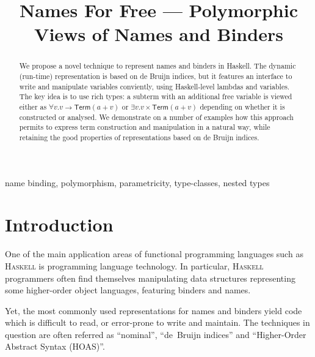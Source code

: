 \documentclass[9pt,authoryear]{sigplanconf}
\title{Names For Free --- Polymorphic Views of Names and Binders}
\begin{document}
\maketitle

\begin{abstract}
We propose a novel technique to represent names and binders in
Haskell. The dynamic (run-time) representation is based on de Bruijn
indices, but it features an interface to write and manipulate
variables conviently, using Haskell-level lambdas and variables. The
key idea is to use rich types: a subterm with an additional free variable
is viewed either as $\forall v. v \rightarrow \mathsf{Term} (a + v)$
or $\exists v. v \times \mathsf{Term} (a + v)$ depending on whether it
is constructed or analysed. We demonstrate on a number of examples how
this approach permits to express term construction and manipulation in
a natural way, while retaining the good properties of representations
based on de Bruijn indices.

\end{abstract}


\begin{keywords}name binding,
polymorphism,
parametricity,
type-classes,
nested types\end{keywords}

\section{Introduction\label{intro}}

%
One of the main application areas of functional programming
    languages such as \textsc{Haskell} is programming language technology.
    In particular, \textsc{Haskell} programmers often find themselves
    manipulating data structures representing some higher-order object
    languages, featuring binders and names.%


%
Yet, the most commonly used representations for names and binders
    yield code which is difficult to read, or error-prone to write
    and maintain. The techniques in question are often referred as
    {``}nominal{''}, {``}de{~}Bruijn indices{''} and {``}Higher-Order Abstract Syntax
    (HOAS){''}.%
\end{document}
